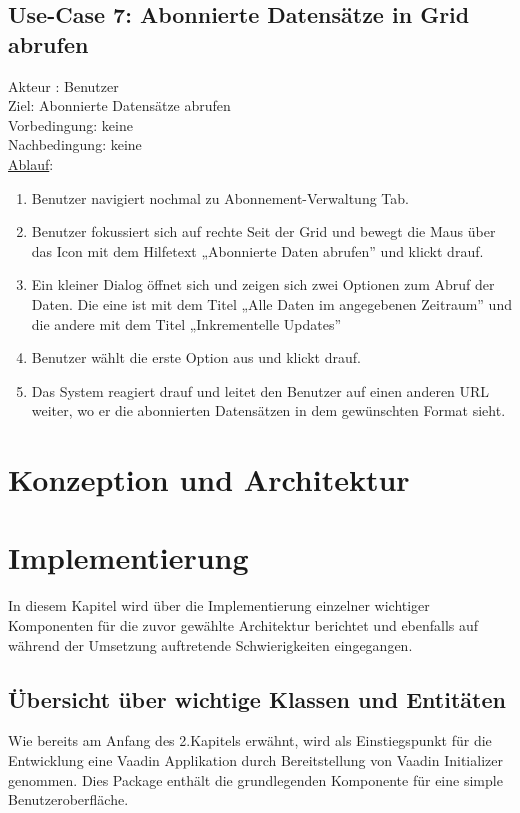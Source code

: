 \documentclass[a4paper,12pt]{scrreprt}
\begin{document}
	\section*{\small \textbf{Use-Case 7: Abonnierte Datensätze in Grid abrufen}}
	Akteur : Benutzer\\
	Ziel: Abonnierte Datensätze abrufen\\
	Vorbedingung: keine\\
	Nachbedingung: keine\\
	\underline{Ablauf}:
	\begin{enumerate}
		\item Benutzer navigiert nochmal zu Abonnement-Verwaltung Tab. 
		\item Benutzer fokussiert sich auf rechte Seit der Grid und bewegt die Maus über das Icon mit dem Hilfetext „Abonnierte Daten abrufen” und klickt drauf.
		\item Ein kleiner Dialog öffnet sich und zeigen sich zwei Optionen zum Abruf der Daten. Die eine ist mit dem Titel „Alle Daten im angegebenen Zeitraum” und die andere mit dem Titel „Inkrementelle Updates”
		\item Benutzer wählt die erste Option aus und klickt drauf.
		\item Das System reagiert drauf und leitet den Benutzer auf einen anderen URL weiter, wo er die abonnierten Datensätzen in dem gewünschten Format sieht. 
	\end{enumerate}
	
	\chapter{Konzeption und Architektur}
	
	\chapter{Implementierung}
	In diesem Kapitel wird über die Implementierung einzelner wichtiger Komponenten für die zuvor gewählte Architektur berichtet und ebenfalls auf während der Umsetzung auftretende Schwierigkeiten eingegangen. 
	\section{Übersicht über wichtige Klassen und Entitäten}
	Wie bereits am Anfang des 2.Kapitels erwähnt, wird als Einstiegspunkt für die Entwicklung eine Vaadin Applikation durch Bereitstellung von Vaadin Initializer genommen. Dies Package enthält die grundlegenden Komponente für eine simple Benutzeroberfläche. 
	
\end{document}
